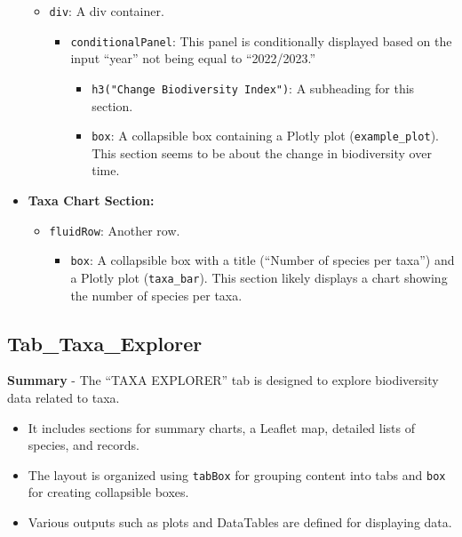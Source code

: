 \documentclass[
]{book}
\providecommand{\tightlist}{%
  \setlength{\itemsep}{0pt}\setlength{\parskip}{0pt}}
\begin{document}
\begin{itemize}
  \begin{itemize}
  \tightlist
  \item
    \texttt{div}: A div container.

    \begin{itemize}
    \tightlist
    \item
      \texttt{conditionalPanel}: This panel is conditionally displayed based on the input ``year'' not being equal to ``2022/2023.''

      \begin{itemize}
      \tightlist
      \item
        \texttt{h3("Change\ Biodiversity\ Index")}: A subheading for this section.
      \item
        \texttt{box}: A collapsible box containing a Plotly plot (\texttt{example\_plot}). This section seems to be about the change in biodiversity over time.
      \end{itemize}
    \end{itemize}
  \end{itemize}
\item
  \textbf{Taxa Chart Section:}

  \begin{itemize}
  \tightlist
  \item
    \texttt{fluidRow}: Another row.

    \begin{itemize}
    \tightlist
    \item
      \texttt{box}: A collapsible box with a title (``Number of species per taxa'') and a Plotly plot (\texttt{taxa\_bar}). This section likely displays a chart showing the number of species per taxa.
    \end{itemize}
  \end{itemize}
\end{itemize}

\hypertarget{tab_taxa_explorer}{%
\subsection{Tab\_Taxa\_Explorer}\label{tab_taxa_explorer}}

\textbf{Summary}
- The ``TAXA EXPLORER'' tab is designed to explore biodiversity data related to taxa.

\begin{itemize}
\item
  It includes sections for summary charts, a Leaflet map, detailed lists of species, and records.
\item
  The layout is organized using \texttt{tabBox} for grouping content into tabs and \texttt{box} for creating collapsible boxes.
\item
  Various outputs such as plots and DataTables are defined for displaying data.
\end{itemize}
\end{document}
